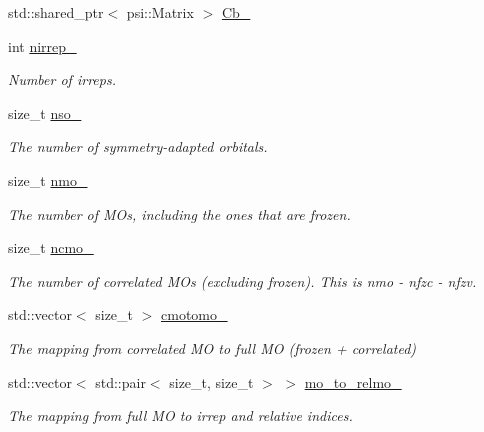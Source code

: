 \begin{DoxyCompactItemize}
\item 
std\+::shared\+\_\+ptr$<$ psi\+::\+Matrix $>$ \mbox{\hyperlink{classforte_1_1_forte_integrals_a865a73e683388b5d09923dc51f42dff0}{Cb\+\_\+}}
\item 
int \mbox{\hyperlink{classforte_1_1_forte_integrals_a3f1ec2352852ca36cbb2317aa899a4e4}{nirrep\+\_\+}}
\begin{DoxyCompactList}\small\item\em Number of irreps. \end{DoxyCompactList}\item 
size\+\_\+t \mbox{\hyperlink{classforte_1_1_forte_integrals_a78b8c5f768c3f2823d5e8e39786ea697}{nso\+\_\+}}
\begin{DoxyCompactList}\small\item\em The number of symmetry-\/adapted orbitals. \end{DoxyCompactList}\item 
size\+\_\+t \mbox{\hyperlink{classforte_1_1_forte_integrals_aafdb1a329cd0768ae5bb6f6ee5157691}{nmo\+\_\+}}
\begin{DoxyCompactList}\small\item\em The number of M\+Os, including the ones that are frozen. \end{DoxyCompactList}\item 
size\+\_\+t \mbox{\hyperlink{classforte_1_1_forte_integrals_ad62e3e6c2be759579a27dae04eeae7c7}{ncmo\+\_\+}}
\begin{DoxyCompactList}\small\item\em The number of correlated M\+Os (excluding frozen). This is nmo -\/ nfzc -\/ nfzv. \end{DoxyCompactList}\item 
std\+::vector$<$ size\+\_\+t $>$ \mbox{\hyperlink{classforte_1_1_forte_integrals_af31074926b010e7bc45231026bc947d0}{cmotomo\+\_\+}}
\begin{DoxyCompactList}\small\item\em The mapping from correlated MO to full MO (frozen + correlated) \end{DoxyCompactList}\item 
std\+::vector$<$ std\+::pair$<$ size\+\_\+t, size\+\_\+t $>$ $>$ \mbox{\hyperlink{classforte_1_1_forte_integrals_a0fa58e78991336eeb446e0d0446f1aee}{mo\+\_\+to\+\_\+relmo\+\_\+}}
\begin{DoxyCompactList}\small\item\em The mapping from full MO to irrep and relative indices. \end{DoxyCompactList}\item 

\end{DoxyCompactItemize}
